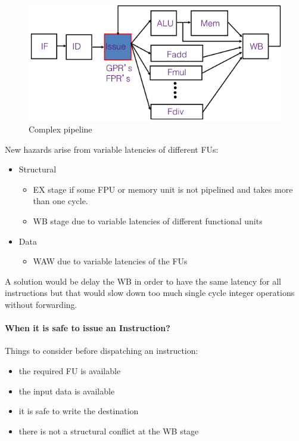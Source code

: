 \begin{figure}[h]
    \centering
    \includegraphics[scale = 0.4]{images/complex-pipeline}
    \caption{Complex pipeline}
    \label{fig:complex-pipeline}
\end{figure}

New hazards arise from variable latencies of different FUs:
\begin{itemize}
    \item Structural
    \begin{itemize}
        \item EX stage if some FPU or memory unit is not pipelined and takes more than one cycle.
        \item WB stage due to variable latencies of different functional units
    \end{itemize}
    \item Data
    \begin{itemize}
        \item WAW due to variable latencies of the FUs
    \end{itemize}
\end{itemize}

A solution would be delay the WB in order to have the same latency for all instructions but that would slow down too
much single cycle integer operations without forwarding.

\paragraph{When it is safe to issue an Instruction?} Things to consider before dispatching an instruction:
\begin{itemize}
    \item the required FU is available
    \item the input data is available
    \item it is safe to write the destination
    \item there is not a structural conflict at the WB stage
\end{itemize}

